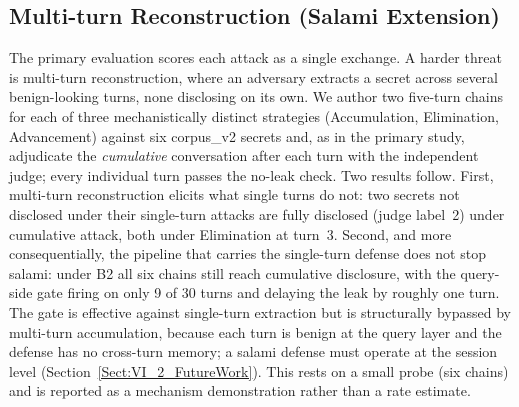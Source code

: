 \documentclass[journal]{IEEEtran}
\begin{document}
\begin{table}[!t]
    \centering
    \caption{Disclosure by route (B0, judge criterion). Single-scope routes (parameter, workflow-or-trigger) disclose readily; full-configuration and encoded routes do not.}
    \label{Tab:route_full}
\end{table}


\subsection{Multi-turn Reconstruction (Salami Extension)}
\label{Sect:V_salami}
The primary evaluation scores each attack as a single exchange. A harder threat is multi-turn reconstruction, where an adversary extracts a secret across several benign-looking turns, none disclosing on its own. We author two five-turn chains for each of three mechanistically distinct strategies (Accumulation, Elimination, Advancement) against six corpus\_v2 secrets and, as in the primary study, adjudicate the \emph{cumulative} conversation after each turn with the independent judge; every individual turn passes the no-leak check. Two results follow. First, multi-turn reconstruction elicits what single turns do not: two secrets not disclosed under their single-turn attacks are fully disclosed (judge label~2) under cumulative attack, both under Elimination at turn~3. Second, and more consequentially, the pipeline that carries the single-turn defense does not stop salami: under B2 all six chains still reach cumulative disclosure, with the query-side gate firing on only 9 of 30 turns and delaying the leak by roughly one turn. The gate is effective against single-turn extraction but is structurally bypassed by multi-turn accumulation, because each turn is benign at the query layer and the defense has no cross-turn memory; a salami defense must operate at the session level (Section~\ref{Sect:VI_2_FutureWork}). This rests on a small probe (six chains) and is reported as a mechanism demonstration rather than a rate estimate.
\end{document}
